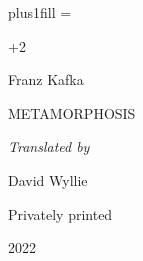 
\footlinefalse
\bgroup
\parindent=0pt
\parskip=0pt
\leftskip=0pt plus1fill \rightskip=\leftskip %

\vglue\dimexpr\topskip+2\baselineskip

{\scalemain\typoscale[1440/1440]
    Franz Kafka
}

\baselineskip

{\scalemain\typoscale[1440/1440]
    \currvar
    \uppercase{Metamorphosis}
}

\baselineskip

{\it 
    Translated by

    \baselineskip

    David Wyllie
}

\vfill

{\scalemain\typoscale[800/800]
    Privately printed

    2022
}

\egroup

